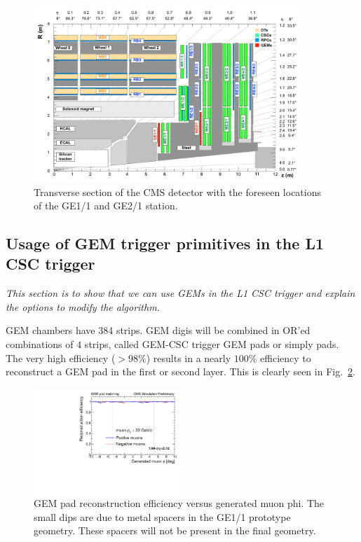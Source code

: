 \begin{figure}[tb]
\begin{center}
\includegraphics[width=0.9\textwidth]{figures/cms_upg_o_g_b_ni_gem_r_grid_130919.pdf}
\caption{Transverse section of the CMS detector with the foreseen locations of the GE1/1 and GE2/1 station.}
\label{fig:cms_upg_o_g_b_ni_gem_r_grid_130919}
\end{center}
\end{figure}

\subsection{Usage of GEM trigger primitives in the L1 CSC trigger}

\textit{This section is to show that we can use GEMs in the L1 CSC trigger and explain the options to modify the algorithm.}

GEM chambers have 384 strips. GEM digis will be combined in \textsc{OR}'ed combinations of $4$ strips, called GEM-CSC trigger GEM pads or simply pads. The very high efficiency ($>98\%$) results in a nearly $100\%$ efficiency to reconstruct a GEM pad in the first or second layer. This is clearly seen in Fig.~\ref{fig:gem_pad_eff_for_LCT_vs_phi_pt20_overlap}. 

\begin{figure}[htb]
\begin{center}
\includegraphics[width=0.5\textwidth]{figures/gem_pad_eff_for_LCT_vs_phi_pt20_overlap.pdf}
\caption{GEM pad reconstruction efficiency versus generated muon phi. The small dips are due to metal spacers in the GE1/1 prototype geometry. These spacers will not be present in the final geometry.}
\label{fig:gem_pad_eff_for_LCT_vs_phi_pt20_overlap}
\end{center}
\end{figure}

